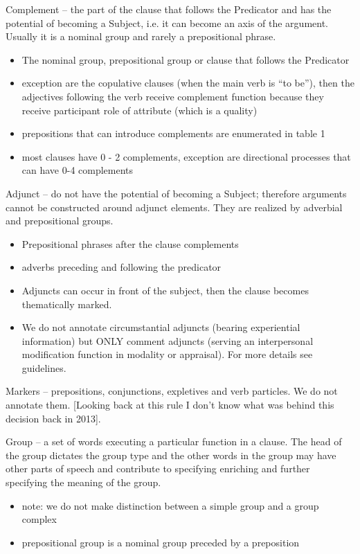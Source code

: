 Complement -- the part of the clause that follows the Predicator and has the potential of becoming a Subject, i.e. it can become an axis of the argument. Usually it is a nominal group and rarely a prepositional phrase. 
\begin{itemize}
    \item The nominal group, prepositional group or clause that follows the Predicator
    \item exception are the copulative clauses (when the main verb is “to be”), then the adjectives following the verb receive complement function because they receive participant role of attribute (which is a quality)
    \item prepositions that can introduce complements are enumerated in table 1
    \item most clauses have 0 - 2 complements, exception are directional processes that can have 0-4 complements
\end{itemize}

Adjunct -- do not have the potential of becoming a Subject; therefore arguments cannot be constructed around adjunct elements. They are realized by adverbial and prepositional groups.
\begin{itemize}
    \item Prepositional phrases after the clause complements
    \item adverbs preceding and following the predicator 
    \item Adjuncts can occur in front of the subject, then the clause becomes thematically marked.
    \item We do not annotate circumstantial adjuncts (bearing experiential information) but ONLY comment adjuncts (serving an interpersonal modification function in modality or appraisal). For more details see \citet{schulz2015me} guidelines.
\end{itemize}

Markers -- prepositions, conjunctions, expletives and verb particles. We do not annotate them. [Looking back at this rule I don't know what was behind this decision back in 2013].

Group -- a set of words executing a particular function in a clause. The head of the group dictates the group type and the other words in the group may have other parts of speech and contribute to specifying enriching and further specifying the meaning of the group.
\begin{itemize}
    \item note: we do not make distinction between a simple group and a group complex
    \item prepositional group is a nominal group preceded by a preposition
\end{itemize}

